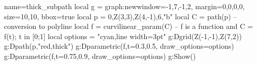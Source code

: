 \documentclass{standalone}%
\begin{document}
\begin{luadraw}{name=thick_subpath}
local g = graph:new{window={-1,7,-1,2}, margin={0,0,0,0}, size={10,10}, bbox=true}
local p = {0,Z(3,3),Z(4,-1),6,"b"}
local C = path(p) -- conversion to polyline
local f = curvilinear_param(C) -- f is a function and C = {f(t); t in [0;1]}
local options = "cyan,line width=3pt"
g:Dgrid({Z(-1,-1),Z(7,2)})
g:Dpath(p,"red,thick")
g:Dparametric(f,{t={0.3,0.5}, draw_options=options})
g:Dparametric(f,{t={0.75,0.9}, draw_options=options})
g:Show()
\end{luadraw}
\end{document}
